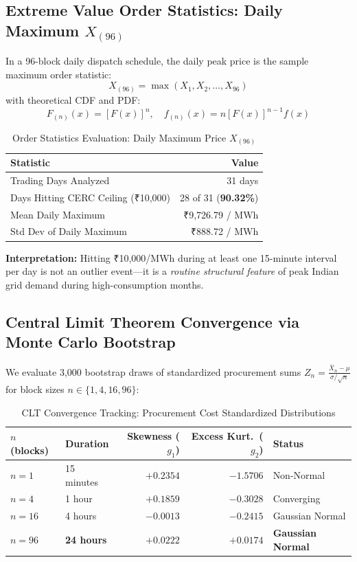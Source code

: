 \documentclass[12pt, a4paper]{article}
\theoremstyle{definition}
\begin{document}
\subsection{Extreme Value Order Statistics: Daily Maximum $X_{(96)}$}

In a 96-block daily dispatch schedule, the daily peak price is the sample maximum order statistic:
\begin{equation}
    X_{(96)} = \max(X_1, X_2, \ldots, X_{96})
\end{equation}
with theoretical CDF and PDF:
\begin{equation}
    F_{(n)}(x) = [F(x)]^n, \quad f_{(n)}(x) = n[F(x)]^{n-1} f(x)
\end{equation}

\begin{table}[H]
\centering
\caption{Order Statistics Evaluation: Daily Maximum Price $X_{(96)}$}
\label{tab:order_stats}
\begin{tabular}{l r}
\toprule
\textbf{Statistic} & \textbf{Value} \\
\midrule
Trading Days Analyzed & 31 days \\
Days Hitting CERC Ceiling (₹10,000) & 28 of 31 (\textbf{90.32\%}) \\
Mean Daily Maximum & ₹9,726.79 / MWh \\
Std Dev of Daily Maximum & ₹888.72 / MWh \\
\bottomrule
\end{tabular}
\end{table}

\textbf{Interpretation:} Hitting ₹10,000/MWh during at least one 15-minute interval per day is not an outlier event---it is a \emph{routine structural feature} of peak Indian grid demand during high-consumption months.

\subsection{Central Limit Theorem Convergence via Monte Carlo Bootstrap}

We evaluate 3,000 bootstrap draws of standardized procurement sums $Z_n = \frac{\bar{X}_n - \mu}{\sigma / \sqrt{n}}$ for block sizes $n \in \{1, 4, 16, 96\}$:

\begin{table}[H]
\centering
\caption{CLT Convergence Tracking: Procurement Cost Standardized Distributions}
\label{tab:clt}
\begin{tabular}{l l r r l}
\toprule
\textbf{$n$ (blocks)} & \textbf{Duration} & \textbf{Skewness ($g_1$)} & \textbf{Excess Kurt.\ ($g_2$)} & \textbf{Status} \\
\midrule
$n = 1$ & 15 minutes & $+0.2354$ & $-1.5706$ & Non-Normal \\
$n = 4$ & 1 hour & $+0.1859$ & $-0.3028$ & Converging \\
$n = 16$ & 4 hours & $-0.0013$ & $-0.2415$ & Gaussian Normal \\
\textbf{$n = 96$} & \textbf{24 hours} & $\boldsymbol{+0.0222}$ & $\boldsymbol{+0.0174}$ & \textbf{Gaussian Normal} \\
\bottomrule
\end{tabular}
\end{table}
\end{document}
